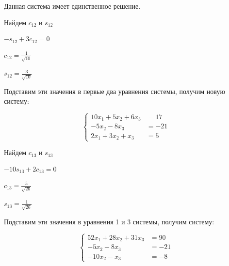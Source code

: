 Данная система имеет единственное решение.
 
Найдем  \begin{math}
	c_{12}
\end{math} и
\begin{math}
	s_{12}
\end{math}

\begin{math}
	-s_{12}+3c_{12}=0
\end{math}

\begin{math}
	c_{12}=\frac1{\sqrt{10}}
\end{math}

\begin{math}
	s_{12}=\frac3{\sqrt{10}}
\end{math}

Подставим эти значения в первые два уравнения системы, получим новую систему:

\begin{equation*}
	\begin{cases}
		10x_{1}+5x_{2}+6x_{3}&=17\\
		-5x_{2}-8x_{3}&=-21\\
		2x_{1}+3x_{2}+x_{3}&=5
	\end{cases}
\end{equation*}

Найдем 
\begin{math}
	c_{13}
\end{math} и
\begin{math}
	s_{13}
\end{math}

\begin{math}
	-10s_{13}+2c_{13}=0
\end{math}

\begin{math}
	c_{13}=\frac5{\sqrt{26}}
\end{math}

\begin{math}
	s_{13}=\frac1{\sqrt{26}}
\end{math}

Подставим эти значения в уравнения 1 и 3 системы, получим систему:

\begin{equation*}
	\begin{cases}
		52x_{1}+28x_{2}+31x_{3}&=90\\
		-5x_{2}-8x_{3}&=-21\\
		-10x_{2}-x_{3}&=-8
	\end{cases}
\end{equation*}

